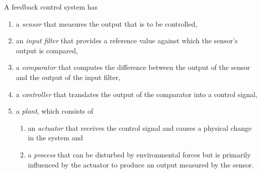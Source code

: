 \begin{solution}
   A feedback control system has
   \begin{enumerate}
      \item a \emph{sensor} that measures the output that is to be controlled,
      \item an \emph{input filter} that provides a reference value against
         which the sensor's output is compared,
      \item a \emph{comparator} that computes the difference between the output
         of the sensor and the output of the input filter,
      \item a \emph{controller} that translates the output of the comparator
         into a control signal,
      \item a \emph{plant}, which consists of
         \begin{enumerate}
            \item an \emph{actuator} that receives the control signal and
               causes a physical change in the system and
            \item a \emph{process} that can be disturbed by environmental
               forces but is primarily influenced by the actuator to produce an
               output measured by the sensor.
         \end{enumerate}
   \end{enumerate}
\end{solution}


